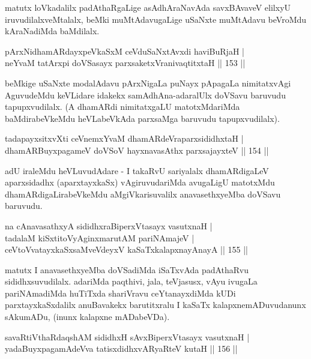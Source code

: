 \begin{artha}
matutx loVkadalilx padAthaRgaLige asAdhAraNavAda savxBAvaveV elilxyU iruvudilalxveMtalalx, beMki muMtAdavugaLige uSaNxte muMtAdavu beVroMdu kAraNadiMda baMdilalx.
\end{artha}

\begin{shl}
pArxNidhamARdayxpeVkaSxM ceVduSaNxtAvxdi haviBuRjaH | \\
neYvaM tatArxpi doVSasayx parxsaketxVranivaqtitxtaH \hfill||  153 ||  
\end{shl}

\begin{artha}
beMkige uSaNxte modalAdavu pArxNigaLa puNayx pApagaLa nimitatxvAgi AguvudeMdu keVLidare idakekx samAdhAna-adaralUlx doVSavu baruvudu tapupxvudilalx. (A dhamARdi nimitatxgaLU matotxMdariMda baMdirabeVkeMdu heVLabeVkAda parxsaMga baruvudu tapupxvudilalx).
\end{artha}

\begin{shl}
tadapayxsitxvXti ceVnemxYvaM dhamARdeVraparxsididhxtaH | \\
dhamARBuyxpagameV doVSoV hayxnavasAthx parxsajayxteV \hfill||  154 ||  
\end{shl}

\begin{artha}
adU iraleMdu heVLuvudAdare - I takaRvU sariyalalx dhamARdigaLeV aparxsidadhx (aparxtayxkaSx) vAgiruvudariMda avugaLigU matotxMdu dhamARdigaLirabeVkeMdu aMgiVkarisuvalilx anavasethxyeMba doVSavu baruvudu.
\end{artha}

\begin{shl}
na cAnavasathxyA sididhxraBiperxVtasayx vasutxnaH | \\
tadalaM kiSxtitoVyAginxmarutAM pariNAmajeV | \\
ceVtoVvatayxkaSxsaMveVdeyxV kaSaTxkalapxnayA\s nayA \hfill||  155 ||  
\end{shl}	

\begin{artha}
matutx I anavasethxyeMba doVSadiMda iSaTxvAda padAthaRvu sididhxsuvudilalx. adariMda paqthivi, jala, teVjasusx, vAyu ivugaLa pariNAmadiMda huTiTxda shariVravu ceYtanayxdiMda kUDi parxtayxkaSxdalilx anuBavakekx barutitxralu I kaSaTx kalapxnemADuvudanunx sAkumADu, (inunx kalapxne mADabeVDa).
\end{artha}

\begin{shl}
savaRtiVthaRdaqshAM sididhxH sAvxBiperxVtasayx vasutxnaH | \\
yadaBuyxpagamAdeVva tatisxdidhxvARyaRteV kutaH \hfill||  156 ||  
\end{shl}


